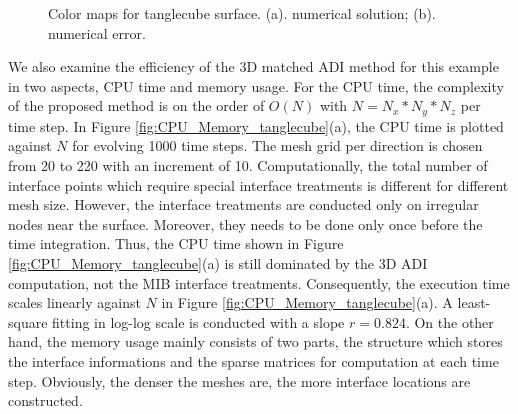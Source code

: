 \documentclass[dissertation]{uathesis}
\begin{document}
\begin{body}
\begin{figure}[!hb]
\begin{center}
	\end{center}
	\caption{Color maps for tanglecube surface. (a). numerical solution; (b). numerical error.}
	\label{fig:color_map_tanglecube}
\end{figure}
%
We also examine the efficiency of the 3D matched ADI method for this example in two aspects, CPU time and memory usage. For the CPU time, 
the complexity of the proposed method is on the order of $O(N)$ with $N=N_x*N_y*N_z$ per time step. In Figure \ref{fig:CPU_Memory_tanglecube}(a), the CPU time is plotted against $N$ for evolving 1000 time steps. The mesh grid per direction is chosen from 20 to 220 with an increment of 10. Computationally, the total number of interface points which require special interface treatments is different for different mesh size. However, the interface treatments are conducted only on irregular nodes near the surface. Moreover, they needs to be done only once before the time integration. Thus, the CPU time shown in Figure \ref{fig:CPU_Memory_tanglecube}(a) is still dominated by the 3D ADI computation, not the MIB interface treatments. Consequently, the execution time scales linearly against $N$ in Figure \ref{fig:CPU_Memory_tanglecube}(a). A least-square fitting in log-log scale is conducted with a slope $r=0.824$. On the other hand, the memory usage mainly consists of two parts, the structure which stores the interface informations and the sparse matrices for computation at each time step. Obviously, the denser the meshes are, the more interface locations are constructed. 

\end{body}
\end{document}

